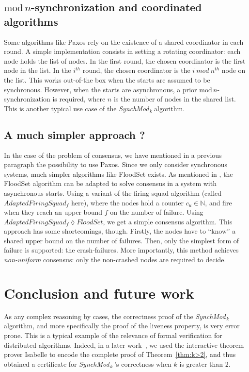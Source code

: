 \documentclass[11pt,letterpaper]{article}
\newcommand{\SM}{{\em SynchMod}$_{\,k}\ $}
\newcommand{\edmargin}[2]{\marginpar{\raggedright\linespread{.7}\footnotesize #1: #2}}
\begin{document}
\subsection{$\mathrm{mod}\,n$-synchronization and coordinated algorithms}

Some algorithms like Paxos rely on the existence of a shared coordinator in each round.
A simple implementation consists in setting a rotating coordinator: 
each node holds the list of nodes. In the first round, the chosen coordinator is the first node in the list.
In the $i^{th}$ round, the chosen coordinator is the $i~mod~n^{th}$ node on the list.
This works out-of-the box when the starts are assumed to be synchronous.
However, when the starts are asynchronous, a prior $\mathrm{mod}\,n$-synchronization is required, where $n$ is the number of nodes in the shared list.
This is another typical use case of the \SM algorithm.

\subsection{A much simpler approach ?}

In the case of the problem of consensus, we have mentioned in a previous paragraph the possibility to use Paxos.
Since we only consider synchronous systems, much simpler algorithms like FloodSet \cite{Lyn96} exists.
As mentioned in \cite{CDDS85}, the FloodSet algorithm can be adapted to solve consensus in a system with asynchronous starts.
Using a variant of the firing squad algorithm (called $AdaptedFiringSquad_f$ here),
where the nodes hold a counter $c_u \in \mathds{N}$, and fire when they reach an upper bound $f$ on the number of failure.
Using $AdaptedFiringSquad_f \lozenge FloodSet$, we get a simple consensus algorithm.
This approach has some shortcomings, though.
Firstly, the nodes have to ``know'' a shared upper bound on the number of failures.
Then, only the simplest form of failure is supported: the crash-failures.
More importantly, this method achieves \textit{non-uniform} consensus: only the non-crashed nodes are required to decide.


\section{Conclusion and future work}

As any complex reasoning by cases, the correctness proof  of the \SM   algorithm, 
	and more specifically the proof of the liveness property, is very error prone. 
This is a typical example of the relevance of formal verification for distributed algorithms. 
Indeed, in a later work~\cite{},\edmargin{sm}{??} we used the interactive theorem prover Isabelle \cite{Merz12}\edmargin{sm}{should refer to Isabelle manual} to encode the complete proof 
	of Theorem~\ref{thm:k>2}, and thus obtained a certificate for  \SM\!\!'s correctness when $k$ is greater than 2.
	
\end{document}
